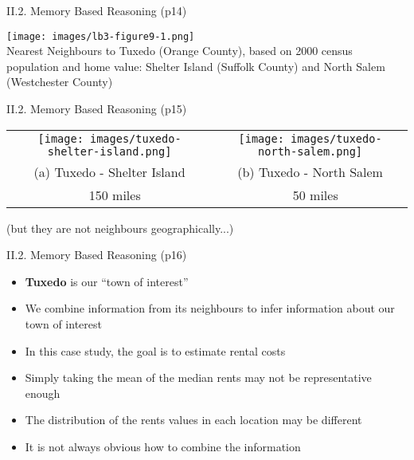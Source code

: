 \documentclass[handout]{beamer}
\begin{document}
\begin{frame}{II.2. Memory Based Reasoning (p14)}
\begin{center}
\texttt{[image: images/lb3-figure9-1.png]}\\
Nearest Neighbours to Tuxedo (Orange County), based on 2000 census population and home value: Shelter Island (Suffolk County) and North Salem (Westchester County)~\cite[Figure 9.1]{LB3:2011}
\end{center}
\end{frame}
\begin{frame}{II.2. Memory Based Reasoning (p15)}
\begin{center}
\begin{tabular}{cc}
\texttt{[image: images/tuxedo-shelter-island.png]} &
\texttt{[image: images/tuxedo-north-salem.png]} \\
(a) Tuxedo - Shelter Island &
(b) Tuxedo - North Salem \\
~ 150 miles & ~ 50 miles \\
\end{tabular}
(but they are not neighbours geographically...)
\end{center}
\end{frame}
\begin{frame}{II.2. Memory Based Reasoning (p16)}
\begin{itemize}
\item \textbf{Tuxedo} is our ``town of interest''
\item We combine information from its neighbours to infer information about our town of interest
\item In this case study, the goal is to estimate rental costs
\item Simply taking the mean of the median rents may not be representative enough
\item The distribution of the rents values in each location may be different
\item It is not always obvious how to combine the information
\end{itemize}
\end{frame}
\end{document}
